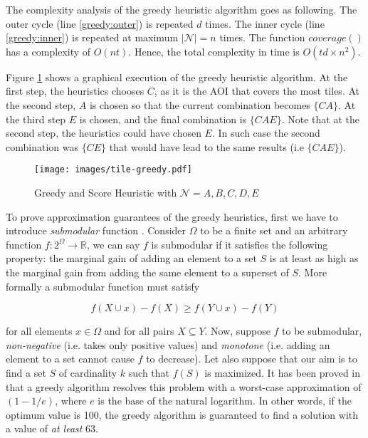 \documentclass[final,10pt,a5paper]{phdimt}
\theoremstyle{definition}
\begin{document}
The complexity analysis of the greedy heuristic algorithm goes as following.
The outer cycle (line \ref{greedy:outer}) is repeated $d$ times. 
The inner cycle (line \ref{greedy:inner}) is repeated at maximum $|\mathscr{N}| = n$ times. 
The function $coverage()$ has a complexity of $O(nt)$.
Hence, the total complexity in time is $O(td \times n^2)$.

Figure \ref{fig:gheur} shows a graphical execution of the greedy heuristic algorithm. At the first step, the heuristics chooses $C$, as it is the AOI that covers the most tiles. At the second step, $A$ is chosen so that the current combination becomes $\{CA\}$. At the third step $E$ is chosen, and the final combination is $\{CAE\}$. Note that at the second step, the heuristics could have chosen $E$.
In such case the second combination was $\{CE\}$ that would have lead to the same results (i.e $\{CAE\}$).

\begin{figure}[tbh]
\centering
\texttt{[image: images/tile-greedy.pdf]}
\caption{Greedy and Score Heuristic with $\mathscr{N}={A,B,C,D,E}$}\label{fig:gheur}
\end{figure}


To prove approximation guarantees of the greedy heuristics, first we have to introduce \textit{submodular} function \cite{nemhauser1978analysis}. 
Consider $\Omega$ to be a finite set and an arbitrary function $f:2^{\Omega} \rightarrow \mathbb{R}$, we can say $f$ is submodular if it satisfies the following property: the marginal gain of adding an element to a set $S$ is at least as high as the marginal gain from adding the same element to a superset of $S$. 
More formally a submodular function must satisfy 

\begin{equation}
f(X \cup {x}) - f(X) \geq f(Y \cup {x}) - f(Y)
\label{eq1}
\end{equation}

for all elements $x \in \Omega$ and for all pairs $X \subseteq Y$.
Now, suppose $f$ to be submodular, \textit{non-negative} (i.e. takes only positive values) and \textit{monotone} (i.e. adding an element to a set cannot cause $f$ to decrease). Let also suppose that our aim is to find a set $S$ of cardinality $k$ such that $f(S)$ is maximized. It has been proved in \cite{nemhauser1978analysis} that a greedy algorithm resolves this problem with a worst-case approximation of $(1-1/e)$, where $e$ is the base of the natural logarithm. In other words, if the optimum value is 100, the greedy algorithm is guaranteed to find a solution with a value of \textit{at least} 63.
\end{document}
